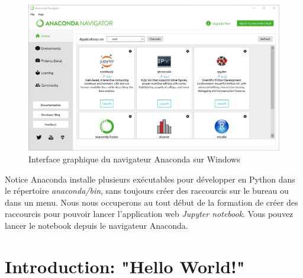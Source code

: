 \documentclass{beamer}
\begin{document}
\begin{frame}

\begin{figure}[!ht]  %
  \centerline{\includegraphics[width=0.7\linewidth]{imgs/AnacondaNavigator.png}}
  \caption{
  Interface graphique du navigateur Anaconda sur Windows
  }
\end{figure}
\end{frame}

\begin{frame}

\begin{block}{Notice}
Anaconda installe plusieurs exécutables pour développer en Python dans le répertoire \emph{anaconda/bin}, sans toujours créer des raccourcis sur le bureau ou dans un menu. Nous nous occuperons au tout début de la formation de créer des raccourcis pour pouvoir lancer l'application web \emph{Jupyter notebook}. Vous pouvez lancer le notebook depuis le navigateur Anaconda.
\end{block}
\end{frame}

\section{Introduction: "Hello World!"}
\end{document}
